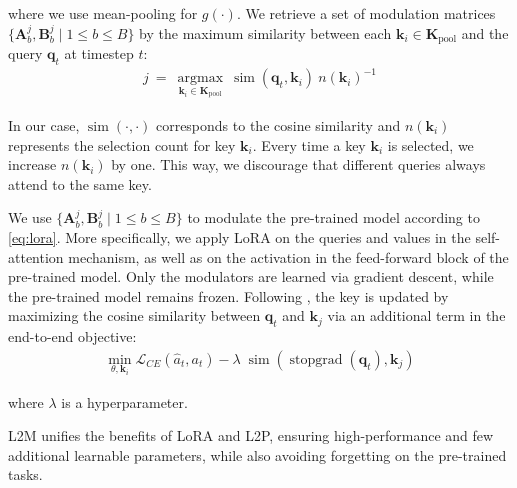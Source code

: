 \documentclass{article}
\begin{document}
where we use mean-pooling for $g(\cdot)$.
We retrieve a set of modulation matrices $\{ \mathbf{A}_{b}^j, \mathbf{B}_{b}^j \mid 1 \leq b \leq B\}$ by the maximum similarity between each $\mathbf{k}_i \in \mathbf{K}_{\text{pool}}$ and the query $\mathbf{q}_t$ at timestep $t$:
{
\setlength{\abovedisplayskip}{4pt}
\setlength{\belowdisplayskip}{3pt}
\begin{gather}
    j \ = \ \operatorname*{argmax}_{\mathbf{k}_i \in \mathbf{K}_\text{pool}} \ \operatorname{sim} (\mathbf{q}_t, \mathbf{k}_i) \ n(\mathbf{k}_i)^{-1}
\end{gather}
}

In our case, $\operatorname{sim}(\cdot, \cdot)$ corresponds to the cosine similarity and $n(\mathbf{k}_i)$ represents the selection count for key $\mathbf{k}_i$. 
Every time a key $\mathbf{k}_i$ is selected, we increase $n(\mathbf{k}_i)$ by one.
This way, we discourage that different queries always attend to the same key. 

We use $\{ \mathbf{A}_{b}^j, \mathbf{B}_{b}^j \mid 1 \leq b \leq B\}$ to modulate the pre-trained model according to \cref{eq:lora}. 
More specifically, we apply LoRA on the queries and values in the self-attention mechanism, as well as on the activation in the feed-forward block of the pre-trained model. 
Only the modulators are learned via gradient descent, while the pre-trained model remains frozen.
Following \citet{Wang:22}, the key is updated by maximizing the cosine similarity between $\mathbf{q}_t$ and $\mathbf{k}_j$ via an additional term in the end-to-end objective:
{
\setlength{\abovedisplayskip}{4pt}
\setlength{\belowdisplayskip}{3pt}
\begin{gather}
    \min_{\theta, \mathbf{k}_i} \mathcal{L}_{CE}(\hat{a}_t, a_t) - \lambda \;\operatorname{sim} (\operatorname{stopgrad}(\mathbf{q}_t), \mathbf{k}_j)
\end{gather}
}

where $\lambda$ is a hyperparameter.


L2M unifies the benefits of LoRA and L2P, ensuring high-performance and few additional learnable parameters, while also avoiding forgetting on the pre-trained tasks.
\end{document}
